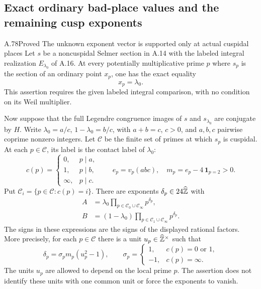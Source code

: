 \subsection{Exact ordinary bad-place values and the remaining cusp exponents}

\begin{statement}{A.78}{Proved}
{The unknown exponent vector is supported only at actual cuspidal places}
Let $s$ be a noncuspidal Selmer section in A.14 with the
labeled integral realization $E_{\lambda_0}$ of A.16.
At every potentially multiplicative prime $p$ where $s_p$
is the section of an ordinary point $x_p$, one has the exact
equality
\[
                              x_p=\lambda_0.
\tag{A.78.1}
\]
This assertion requires the given labeled integral comparison,
with no condition on its Weil multiplier.

Now suppose that the full Legendre congruence images of $s$
and $s_{\lambda_0}$ are conjugate by $H$.
Write
$\lambda_0=a/c$, $1-\lambda_0=b/c$, with
$a+b=c$, $c>0$, and $a,b,c$ pairwise coprime nonzero integers.
Let $\mathcal C$ be the finite set of primes at which $s_p$
is cuspidal.  At each $p\in\mathcal C$, its label is the
contact label of $\lambda_0$:
\[
 c(p)=
 \begin{cases}
 0,&p\mid a,\\
 1,&p\mid b,\\
 \infty,&p\mid c.
 \end{cases}
 \qquad
 e_p=v_p(abc),\quad
 m_p=e_p-4\,\mathbf1_{p=2}>0.
\tag{A.78.2}
\]
Put $\mathcal C_i=\{p\in\mathcal C:c(p)=i\}$.
There are exponents $\delta_p\in24\widehat{\mathbb Z}$ with
\[
 \begin{split}
 A&=\lambda_0
          \prod_{p\in\mathcal C_0\cup\mathcal C_\infty}
                                                        p^{\delta_p},\\
 B&=(1-\lambda_0)
          \prod_{p\in\mathcal C_1\cup\mathcal C_\infty}
                                                        p^{\delta_p}.
 \end{split}
\tag{A.78.3}
\]
The signs in these expressions are the signs of the displayed
rational factors.  More precisely, for each $p\in\mathcal C$
there is a unit $u_p\in\widehat{\mathbb Z}^\times$ such that
\[
 \delta_p=\sigma_p m_p(u_p^2-1),
 \qquad
 \sigma_p=
 \begin{cases}1,&c(p)=0\text{ or }1,\\-1,&c(p)=\infty.
 \end{cases}
\tag{A.78.4}
\]
The units $u_p$ are allowed to depend on the local prime $p$.
The assertion does not identify these units with one common
unit or force the exponents to vanish.
\end{statement}
